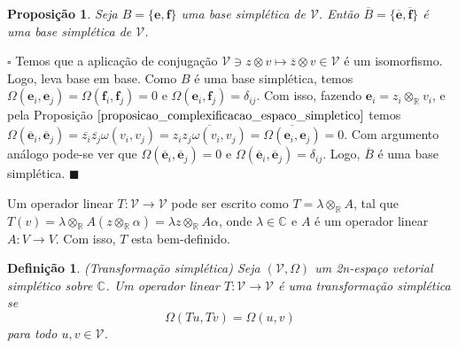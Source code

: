 \documentclass[12pt]{book}
\newtheorem{definicao}[teorema]{Definição}
\newtheorem{proposicao}[teorema]{Proposição}
\newenvironment{prova}[1]{$\square$ #1}{\hfill$\blacksquare$}
\newcommand{\complexificado}[1]{\mathcal{#1}}
\newcommand{\complexificacaoelemento}[2]{#1\otimes_{\reta} #2}
\newcommand{\complexo}[1]{\mathbb{C}^{#1}}
\newcommand{\formaSimpletica}[2]{\omega(#1, #2)}
\newcommand{\formaSimpleticaExtendida}[2]{\Omega(#1, #2)}
\newcommand{\real}[1]{\mathbb{R}^{#1}}
\newcommand{\reta}{\real{}}
\begin{document}
	\begin{proposicao}\label{proposicao_base_simpletica_conjugada}
		Seja $B=\{\textbf{e}, \textbf{f} \}$ uma base simplética de $\complexificado{V}$. Então $\overline{B}=\{\overline{\textbf{e}}, \overline{\textbf{f}}\}$ é uma base simplética de $\complexificado{V}$.
	\end{proposicao}
	\begin{prova}
		Temos que a aplicação de conjugação $\complexificado{V} \ni z\otimes v \mapsto \overline{z}\otimes v \in \complexificado{V}$ é um isomorfismo. Logo, leva base em base. Como $B$ é uma base simplética, temos $\Omega(\textbf{e}_{i}, \textbf{e}_{j}) = \Omega(\textbf{f}_{i}, \textbf{f}_{j}) =0$ e $\Omega(\textbf{e}_{i}, \textbf{f}_{j}) = \delta_{ij}$. Com isso, fazendo $\textbf{e}_{i} = \complexificacaoelemento{z_{i}}{v_{i}}$, e pela Proposição $\ref{proposicao_complexificacao_espaco_simpletico}$ temos $\Omega(\overline{\textbf{e}}_{i}, \overline{\textbf{e}}_{j}) =	\overline{z_{i}}\overline{z_{j}}\formaSimpletica{v_{i}}{v_{j}}=\overline{z_{i}z_{j}\formaSimpletica{v_{i}}{v_{j}}} = \overline{\Omega(\textbf{e}_{i}, \textbf{e}_{j})} = 0$. Com argumento análogo pode-se ver que $\Omega(\overline{\textbf{e}}_{i}, \overline{\textbf{e}}_{j}) =0$ e $\Omega(\overline{\textbf{e}}_{i}, \overline{\textbf{e}}_{j}) =\delta_{ij}$. Logo, $\overline{B}$ é uma base simplética.
	\end{prova}
	
	Um operador linear $T : \complexificado{V} \to \complexificado{V}$ pode ser escrito como $T=\complexificacaoelemento{\lambda}{A}$, tal que $T(v) = \complexificacaoelemento{\lambda}{A}(\complexificacaoelemento{z}{\alpha}) = \complexificacaoelemento{\lambda z}{A\alpha}$, onde $\lambda \in \complexo{}$ e $A$ é um operador linear $A:V \to V$. Com isso, $T$ esta bem-definido.
	
	\begin{definicao}
		(Transformação simplética) Seja $(\complexificado{V}, \Omega)$ um 2n-espaço vetorial simplético sobre $\complexo{}$. Um operador linear $T: \complexificado{V} \to \complexificado{V}$ é uma transformação simplética se 
		$$
		\formaSimpleticaExtendida{Tu}{Tv} = \formaSimpleticaExtendida{u}{v}
		$$ para todo $u,v\in \complexificado{V}$.
	\end{definicao}
	
\end{document}

